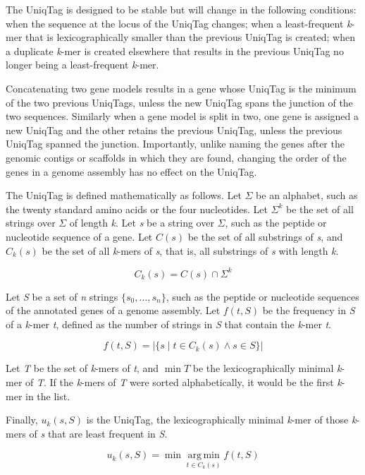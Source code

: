 \documentclass{bioinfo}
\begin{document}
The UniqTag is designed to be stable but will change in the following
conditions: when the sequence at the locus of the UniqTag changes; when
a least-frequent \emph{k}-mer that is lexicographically smaller than the
previous UniqTag is created; when a duplicate \emph{k}-mer is created
elsewhere that results in the previous UniqTag no longer being a
least-frequent \emph{k}-mer.

Concatenating two gene models results in a gene whose UniqTag is the
minimum of the two previous UniqTags, unless the new UniqTag spans the
junction of the two sequences. Similarly when a gene model is split in
two, one gene is assigned a new UniqTag and the other retains the
previous UniqTag, unless the previous UniqTag spanned the junction.
Importantly, unlike naming the genes after the genomic contigs or
scaffolds in which they are found, changing the order of the genes in a
genome assembly has no effect on the UniqTag.

The UniqTag is defined mathematically as follows. Let $\Sigma$ be an
alphabet, such as the twenty standard amino acids or the four
nucleotides. Let $\Sigma^k$ be the set of all strings over $\Sigma$ of
length \emph{k}. Let \emph{s} be a string over $\Sigma$, such as the
peptide or nucleotide sequence of a gene. Let $C(s)$ be the set of all
substrings of \emph{s}, and $C_k(s)$ be the set of all \emph{k}-mers of
\emph{s}, that is, all substrings of \emph{s} with length \emph{k}.

\[
C_k(s) = C(s) \cap \Sigma^k
\]

Let \emph{S} be a set of \emph{n} strings $\{s_0, \dots, s_n\}$, such as
the peptide or nucleotide sequences of the annotated genes of a genome
assembly. Let $f(t, S)$ be the frequency in \emph{S} of a \emph{k}-mer
\emph{t}, defined as the number of strings in \emph{S} that contain the
\emph{k}-mer \emph{t}.

\[
f(t, S) = \left\vert \{ s \mid t \in C_k(s) \wedge s \in S \} \right\vert
\]

Let \emph{T} be the set of \emph{k}-mers of \emph{t}, and $\min T$ be
the lexicographically minimal \emph{k}-mer of \emph{T}. If the
\emph{k}-mers of \emph{T} were sorted alphabetically, it would be the
first \emph{k}-mer in the list.

Finally, $u_k(s, S)$ is the UniqTag, the lexicographically minimal
\emph{k}-mer of those \emph{k}-mers of \emph{s} that are least frequent
in \emph{S}.

\[
u_k(s, S) = \min \mathop{\arg\,\min}\limits_{t \in C_k(s)} f(t, S)
\]
\end{document}
